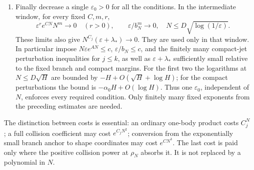 \documentclass[11pt]{article}
\numberwithin{equation}{section}
\theoremstyle{definition}
\newcommand{\eps}{\varepsilon}
\begin{document}
\begin{enumerate}
for every \(N\ge N_0+2\), including the finitely many low orders.
Increase \(B\) further so that
\(\exp((A+4)N^3/2+\tfrac12N^2\log N+C_jN^2)
 (2e^{-BN})^{N^2-2j-4}\) is controlled for all large
\(N\) and every \(j\le k\). Only the remaining numerical bounds
at finitely many orders are absorbed into a point-dependent
constant; their support geometry already satisfies the inclusions.
\item Finally decrease a single \(\eps_0>0\) for all the conditions.
In the intermediate window, for every fixed \(C,m,r\),
\[
 \eps^r e^{CN}N^m\longrightarrow0\quad(r>0),\qquad
 \eps/b_N^m\longrightarrow0,
 \quad N\le D\sqrt{\log(1/\eps)}.
\]
These limits also give \(N^{C_j}(\eps+\lambda_*)\to0\).
They are used only in that window.
In particular impose \(N\eps e^{AN}\le c\),
\(\eps/b_N\le c\), and the finitely many compact-jet
perturbation inequalities for \(j\le k\), as well as
\(\eps+\lambda_*\) sufficiently small relative to the fixed
branch and compact margins. For the first two the logarithms
at \(N\le D\sqrt H\) are bounded by
\(-H+O(\sqrt H+\log H)\); for the compact perturbations the bound
is \(-\alpha_0H+O(\log H)\). Thus one \(\eps_0\), independent
of \(N\), enforces every required condition. Only finitely many
fixed exponents from the preceding estimates are needed.
\end{enumerate}

The distinction between costs is essential: an ordinary one-body
product costs \(C_j^N\); a full collision coefficient may cost
\(e^{C_jN^2}\); conversion from the exponentially small branch
anchor to shape coordinates may cost \(e^{CN^3}\). The last cost
is paid only where the positive collision power at \(\rho_N\)
absorbs it. It is not replaced by a polynomial in \(N\).
\end{document}
